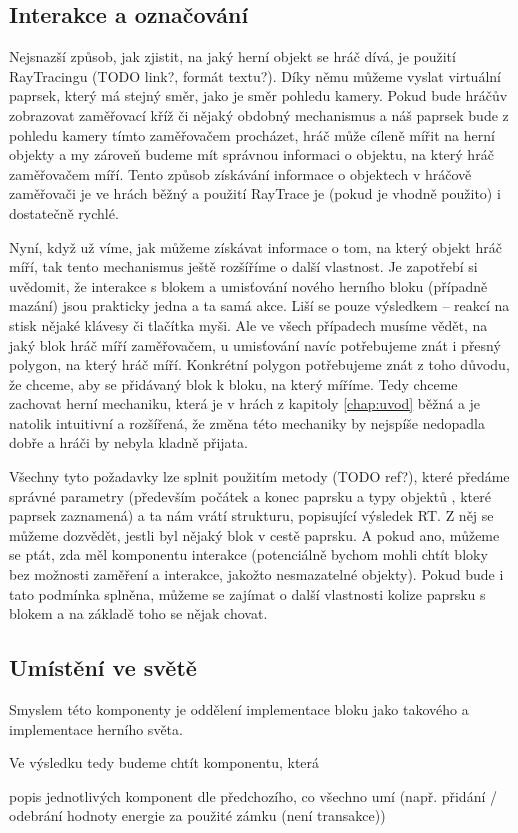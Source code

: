 \subsection{Interakce a označování}

Nejsnazší způsob, jak zjistit, na jaký herní objekt se hráč dívá, je použití RayTracingu (TODO link?, formát textu?). Díky němu můžeme  vyslat virtuální paprsek, který má stejný směr, jako je směr pohledu kamery. Pokud bude hráčův \HUD{} zobrazovat zaměřovací kříž či nějaký obdobný mechanismus a náš paprsek bude z pohledu kamery tímto zaměřovačem procházet, hráč může cíleně mířit na herní objekty a my zároveň budeme mít správnou informaci o objektu, na který hráč zaměřovačem míří. Tento způsob získávání informace o objektech v hráčově zaměřovači je ve hrách běžný a použití RayTrace je (pokud je vhodně použito) i dostatečně rychlé.

Nyní, když už víme, jak můžeme získávat informace o tom, na který objekt hráč míří, tak tento mechanismus ještě rozšíříme o další vlastnost. Je zapotřebí si uvědomit, že interakce s blokem a umisťování nového herního bloku (případně mazání) jsou prakticky jedna a ta samá akce. Liší se pouze výsledkem -- reakcí na stisk nějaké klávesy či tlačítka myši. Ale ve všech případech musíme vědět, na jaký blok hráč míří zaměřovačem, u umisťování navíc potřebujeme znát i přesný polygon, na který hráč míří. Konkrétní polygon potřebujeme znát z toho důvodu, že chceme, aby se přidávaný blok  k bloku, na který míříme. Tedy chceme zachovat herní mechaniku, která je v hrách z kapitoly \ref{chap:uvod} běžná a je natolik intuitivní a rozšířená, že změna této mechaniky by nejspíše nedopadla dobře a hráči by nebyla kladně přijata.

Všechny tyto požadavky lze splnit použitím metody  (TODO ref?), které předáme správné parametry (především počátek a konec paprsku a typy objektů , které paprsek zaznamená) a ta nám vrátí strukturu, popisující výsledek RT. Z něj se můžeme dozvědět, jestli byl nějaký blok v cestě paprsku. A pokud ano, můžeme se ptát, zda měl komponentu interakce (potenciálně bychom mohli chtít bloky bez možnosti zaměření a interakce, jakožto nesmazatelné objekty). Pokud bude i tato podmínka splněna, můžeme se zajímat o další vlastnosti kolize paprsku s blokem a na základě toho se nějak chovat.


\subsection{Umístění ve světě}

Smyslem této komponenty je oddělení implementace bloku jako takového a implementace herního světa.


Ve výsledku tedy budeme chtít komponentu, která 

popis jednotlivých komponent dle předchozího, co všechno umí (např. přidání / odebrání hodnoty energie za použité zámku (není transakce))



